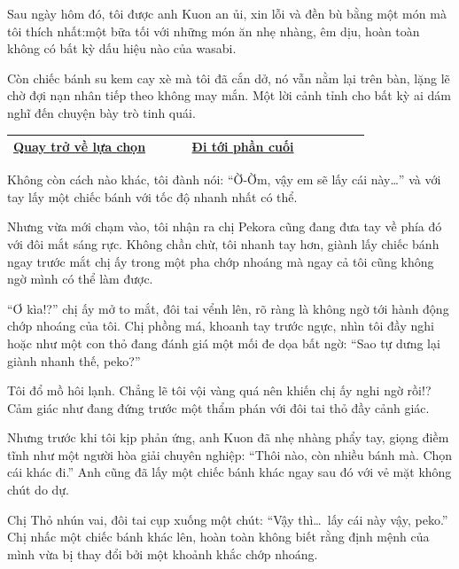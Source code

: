 \documentclass[../main.tex]{subfiles}
\begin{document}
Sau ngày hôm đó, tôi được anh Kuon an ủi, xin lỗi và đền bù bằng một món mà tôi thích nhất:một bữa tối với những món ăn nhẹ nhàng, êm dịu, hoàn toàn không có bất kỳ dấu hiệu nào của wasabi.

Còn chiếc bánh su kem cay xè mà tôi đã cắn dở, nó vẫn nằm lại trên bàn, lặng lẽ chờ đợi nạn nhân tiếp theo không may mắn. Một lời cảnh tỉnh cho bất kỳ ai dám nghĩ đến chuyện bày trò tinh quái.

\begin{table}[H]
  \centering
  \setlength{\arrayrulewidth}{1pt}
  \begin{tabular}{|>{\centering\arraybackslash}p{0.4\linewidth}|>{\centering\arraybackslash}p{0.4\linewidth}|}
    \hline
    \hyperref[choice]{Quay trở về lựa chọn} & \hyperref[ending]{Đi tới phần cuối} \\ \hline
  \end{tabular}
\end{table}

\newpage
\label{cakeB}

Không còn cách nào khác, tôi đành nói: ``Ờ-Ờm, vậy em sẽ lấy cái này\dots'' và với tay lấy một chiếc bánh với tốc độ nhanh nhất có thể.

Nhưng vừa mới chạm vào, tôi nhận ra chị Pekora cũng đang đưa tay về phía đó với đôi mắt sáng rực. Không chần chừ, tôi nhanh tay hơn, giành lấy chiếc bánh ngay trước mắt chị ấy trong một pha chớp nhoáng mà ngay cả tôi cũng không ngờ mình có thể làm được.

``Ơ kìa!?'' chị ấy mở to mắt, đôi tai vểnh lên, rõ ràng là không ngờ tới hành động chớp nhoáng của tôi. Chị phồng má, khoanh tay trước ngực, nhìn tôi đầy nghi hoặc như một con thỏ đang đánh giá một mối đe dọa bất ngờ: ``Sao tự dưng lại giành nhanh thế, peko?''

Tôi đổ mồ hôi lạnh. Chẳng lẽ tôi vội vàng quá nên khiến chị ấy nghi ngờ rồi!? Cảm giác như đang đứng trước một thẩm phán với đôi tai thỏ đầy cảnh giác.

Nhưng trước khi tôi kịp phản ứng, anh Kuon đã nhẹ nhàng phẩy tay, giọng điềm tĩnh như một người hòa giải chuyên nghiệp: ``Thôi nào, còn nhiều bánh mà. Chọn cái khác đi.'' Anh cũng đã lấy một chiếc bánh khác ngay sau đó với vẻ mặt không chút do dự.

Chị Thỏ nhún vai, đôi tai cụp xuống một chút: ``Vậy thì\dots\ lấy cái này vậy, peko.'' Chị nhấc một chiếc bánh khác lên, hoàn toàn không biết rằng định mệnh của mình vừa bị thay đổi bởi một khoảnh khắc chớp nhoáng.
\end{document}
